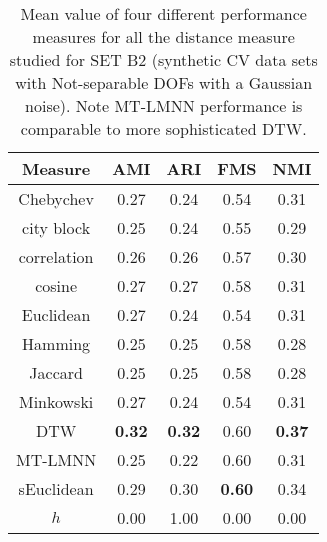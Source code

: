 \begin{table}[h]
     \centering
\begin{tabular}{ |c|c|c|c|c| }
  \hline
Measure    & 	 AMI &	 ARI &	 FMS &	 NMI \\
\hline
Chebychev & 	 0.27 &	 0.24 	& 0.54 &	0.31 \\
city block  &	 0.25 &	 0.24 &	 0.55 &	0.29 \\
correlation &	 0.26 &	 0.26 &	 0.57 &	0.30 \\
cosine    & 	 0.27 &	 0.27 &	 0.58 &	0.31 \\
Euclidean  	& 0.27 	& 0.24 	& 0.54 &	0.31 \\
Hamming    &	 0.25 &	 0.25 &	 0.58 &	0.28 \\
Jaccard   & 	 0.25 &	 0.25 &	 0.58 &	0.28 \\
Minkowski  &	 0.27 &	 0.24 &	 0.54 &	0.31 \\
DTW       & 	 \textbf{0.32} &	 \textbf{0.32} &	 0.60 &	\textbf{0.37} \\
MT-LMNN   & 	 0.25 &	 0.22 &	 0.60 &	0.31 \\
sEuclidean &	 0.29 &	 0.30 &	 \textbf{0.60} &	0.34 \\
\hline
$h$ &    	 0.00& 	 1.00 &	 0.00 &	0.00 \\
\hline
\end{tabular}
    \captionsetup{justification=centering}
     \caption{Mean value of four different performance measures for all the distance measure studied for SET B2 (synthetic CV data sets with Not-separable DOFs with a Gaussian noise). Note MT-LMNN performance is comparable to more sophisticated DTW.}
     \label{ttest_setb2}
 \end{table}
